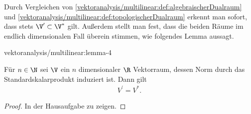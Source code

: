 \documentclass[letterpaper,10pt,german]{jupyterBook}
\begin{document}
\par
Durch Vergleichen von \cref{vektoranalysis/multilinear:def:algebraischerDualraum} und \cref{vektoranalysis/multilinear:def:topologischerDualraum} erkennt man sofort, dass stets \(\V^\prime\subset \V^\ast\) gilt.
Außerdem stellt man fest, dass die beiden Räume im endlich dimensionalen Fall überein stimmen, wie folgendes Lemma aussagt.
\begin{lemma}{}{vektoranalysis/multilinear:lemma-4}



\par
Für \(n\in\N\) sei \(\V\) ein \(n\) dimensionaler \(\R\) Vektorraum, dessen Norm durch das Standardskalarprodukt induziert ist.
Dann gilt
\begin{align*}
V^\prime = V^\ast.
\end{align*}\end{lemma}

\begin{proof}
 In der Hausaufgabe zu zeigen.
\end{proof}
\end{document}
